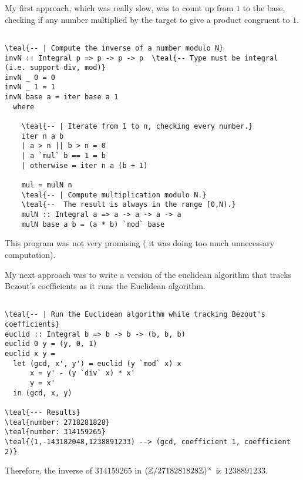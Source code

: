 \begin{Answer}

My first approach, which was really slow, was to count up from $1$ to the base,
checking if any number multiplied by the target to give a product congruent to $1$.

\color{crimson}
\begin{Verbatim}[commandchars=\\\{\}]

\teal{-- | Compute the inverse of a number modulo N}
invN :: Integral p => p -> p -> p  \teal{-- Type must be integral (i.e. support div, mod)}
invN _ 0 = 0
invN _ 1 = 1
invN base a = iter base a 1
  where

    \teal{-- | Iterate from 1 to n, checking every number.}
    iter n a b
    | a > n || b > n = 0
    | a `mul` b == 1 = b
    | otherwise = iter n a (b + 1)
  
    mul = mulN n
    \teal{-- | Compute multiplication modulo N.}
    \teal{--  The result is always in the range [0,N).}
    mulN :: Integral a => a -> a -> a -> a
    mulN base a b = (a * b) `mod` base
\end{Verbatim}
\color{black}

This program was not very promising ( it was doing too much unnecessary computation).

My next approach was to write a version of the euclidean algorithm that
tracks Bezout's coefficients as it runs the Euclidean algorithm.
\color{crimson}
\begin{Verbatim}[commandchars=\\\{\}]

\teal{-- | Run the Euclidean algorithm while tracking Bezout's coefficients}
euclid :: Integral b => b -> b -> (b, b, b)
euclid 0 y = (y, 0, 1)
euclid x y =
  let (gcd, x', y') = euclid (y `mod` x) x
      x = y' - (y `div` x) * x'
      y = x'
  in (gcd, x, y)

\teal{--- Results}
\teal{number: 2718281828}
\teal{number: 314159265}
\teal{(1,-143182048,1238891233) --> (gcd, coefficient 1, coefficient 2)}

\end{Verbatim}
\color{black}

Therefore, the inverse of $314159265$ in $(\mathbb{Z}/2718281828\mathbb{Z})^\times$ is $1238891233$.

\end{Answer}
